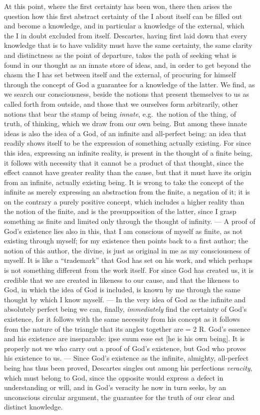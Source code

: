 At this point, where the first certainty has been won, there then arises the question how this first abstract certainty of the I about itself can be filled out and become a knowledge, and in particular a knowledge of the external, which the I in doubt excluded from itself. Descartes, having first laid down that every knowledge that is to have validity must have the same certainty, the same clarity and distinctness as the point of departure, takes the path of seeking what is found in our thought as an innate store of ideas, and, in order to get beyond the chasm the I has set between itself and the external, of procuring for himself through the concept of God a guarantee for a knowledge of the latter. We find, as we search our consciousness, beside the notions that present themselves to us as called forth from outside, and those that we ourselves form arbitrarily, other notions that bear the stamp of being \emph{innate}, e.g.\ the notion of the thing, of truth, of thinking, which we draw from our own being. But among these innate ideas is also the idea of a God, of an infinite and all-perfect being: an idea that readily shows itself to be the expression of something actually existing. For since
this idea, expressing an infinite reality, is present in the thought of a finite being, it follows with necessity that it cannot be a product of that thought, since the effect cannot have greater reality than the cause, but that it must have its origin from an infinite, actually existing being. It is wrong to take the concept of the infinite as merely expressing an abstraction from the finite, a negation of it; it is on the contrary a purely positive concept, which includes a higher reality than the notion of the finite, and is the presupposition of the latter, since I grasp something as finite and limited only through the thought of infinity. --- A proof of God's existence lies also in this, that I am conscious of myself as finite, as not existing through myself; for my existence then points back to a first author; the notion of this author, the divine, is just as original in me as my consciousness of myself. It is like a ``trademark'' that God has set on his work, and which perhaps is not something different from the work itself. For since God has created us, it is credible that we are created in likeness to our cause, and that the likeness to God, in which the idea of God is included, is known by me through the same thought by which I know myself. --- In the very idea of God as the infinite and absolutely perfect being we can, finally, \emph{immediately} find the certainty of God's existence, for it follows with the same necessity from his concept as it follows from the nature of the triangle that its angles together are = 2 R. God's essence and his existence are inseparable: ipse suum esse est [he is his own being]. It is properly not we who carry out a proof of God's existence, but God who proves his existence to us. --- Since God's existence as the infinite, almighty, all-perfect being has thus been proved, Descartes singles out among his perfections \emph{veracity}, which must belong to God, since the opposite would express a defect in understanding or will, and in God's veracity he now in turn seeks, by an unconscious circular argument, the guarantee for the truth of our clear and distinct knowledge.
